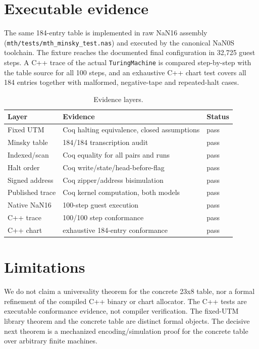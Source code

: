 \documentclass[11pt]{article}
\begin{document}
\section{Executable evidence}
The same 184-entry table is implemented in raw NaN16 assembly
(\texttt{mth/tests/mth\_minsky\_test.nas}) and executed by the canonical NaN0S
toolchain.  The fixture reaches the documented final configuration in 32,725
guest steps.  A C++ trace of the actual \texttt{TuringMachine} is compared
step-by-step with the table source for all 100 steps, and an exhaustive C++
chart test covers all 184 entries together with malformed, negative-tape and
repeated-halt cases.

\begin{table}[h]
\centering
\begin{tabular}{@{}lll@{}}
\toprule
Layer & Evidence & Status\\
\midrule
Fixed UTM & Coq halting equivalence, closed assumptions & pass\\
Minsky table & 184/184 transcription audit & pass\\
Indexed/scan & Coq equality for all pairs and runs & pass\\
Halt order & Coq write/state/head-before-flag & pass\\
Signed address & Coq zipper/address bisimulation & pass\\
Published trace & Coq kernel computation, both models & pass\\
Native NaN16 & 100-step guest execution & pass\\
C++ trace & 100/100 step conformance & pass\\
C++ chart & exhaustive 184-entry conformance & pass\\
\bottomrule
\end{tabular}
\caption{Evidence layers.}
\end{table}

\section{Limitations}
We do not claim a universality theorem for the concrete 23x8 table, nor a
formal refinement of the compiled C++ binary or chart allocator.  The C++ tests
are executable conformance evidence, not compiler verification.  The fixed-UTM
library theorem and the concrete table are distinct formal objects.  The
decisive next theorem is a mechanized encoding/simulation proof for the concrete
table over arbitrary finite machines.
\end{document}
